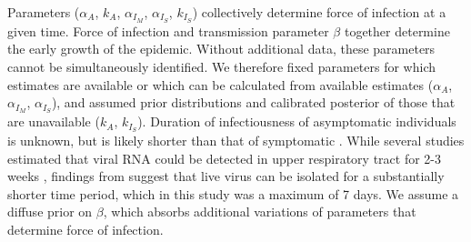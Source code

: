 \documentclass[11pt]{article}
\begin{document}
Parameters ($\alpha_A$, $k_A$, $\alpha_{I_M}$, $\alpha_{I_S}$, $k_{I_S}$) collectively determine force of infection at a given time. Force of infection and transmission parameter $\beta$ together
determine the early growth of the epidemic. Without additional data, these parameters cannot be simultaneously identified. We therefore fixed parameters for which estimates are available or which can be calculated from available estimates ($\alpha_A$, $\alpha_{I_M}$, $\alpha_{I_S}$), and assumed prior distributions and calibrated posterior of those that are unavailable ($k_A$, $k_{I_S}$). 
Duration of infectiousness of asymptomatic individuals is unknown, but is likely shorter than that of symptomatic \citep{yang2020comparison}. While several studies estimated that viral RNA could be detected in upper respiratory tract for 2-3 weeks \citep{young2020epidemiologic, kujawski2020clinical}, findings from \citep{wolfel2020virological} suggest that live virus can be isolated for a substantially shorter time period, which in this study was a maximum of 7 days. 
We assume a diffuse prior on $\beta$, which absorbs additional variations of parameters that determine force of infection. \\
\end{document}
